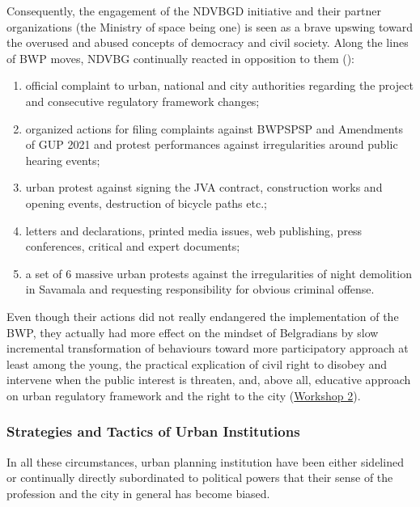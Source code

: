 \documentclass[11pt]{report}
\begin{document}
{Consequently, the engagement of the NDVBGD initiative and their partner organizations (the Ministry of space being one) is seen as a brave upswing toward the overused and abused concepts of democracy and civil society.
Along the lines of BWP moves, NDVBG continually reacted in opposition to them (\href{NDVBGD}{\cite{NDVBGD2016}}):

\begin{enumerate}

\item official complaint to urban, national and city authorities regarding the project and consecutive regulatory framework changes;
\item organized actions for filing complaints against BWPSPSP and Amendments of GUP 2021 and protest performances against irregularities around public hearing events;
\item urban protest against signing the JVA contract, construction works and opening events, destruction of bicycle paths etc.;
\item letters and declarations, printed media issues, web publishing, press conferences, critical and expert documents;
\item a set of 6 massive urban protests against the irregularities of night demolition in Savamala and requesting responsibility for obvious criminal offense. 

\end{enumerate}

Even though their actions did not really endangered the implementation of the BWP, they actually had more effect on the mindset of Belgradians by slow incremental transformation of behaviours toward more participatory approach at least among the young, the practical explication of civil right to disobey and intervene when the public interest is threaten, and, above all, educative approach on urban regulatory framework and the right to the city
(\href{PHD Workshop}{Workshop 2}).

\subsubsection{Strategies and Tactics of Urban Institutions}

In all these circumstances, urban planning institution have been either sidelined or continually directly subordinated to political powers that their sense of the profession and the city in general has become biased.
\\

}
\end{document}
